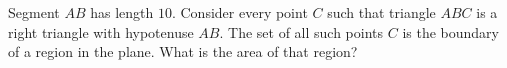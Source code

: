 Segment $AB$ has length $10$. Consider every point $C$ such that triangle $ABC$ is a right triangle with hypotenuse $AB$. The set of all such points $C$ is the boundary of a region in the plane. What is the area of that region?
